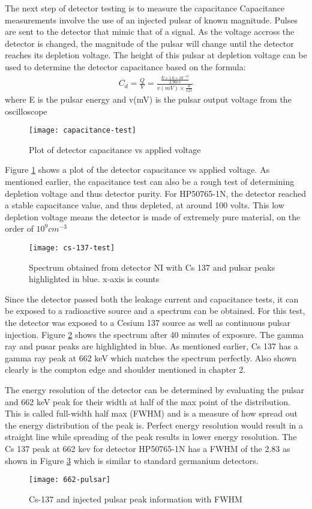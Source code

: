 The next step of detector testing is to measure the capacitance
Capacitance measurements involve the use of an injected pulsar of known magnitude.
Pulses are sent to the detector that mimic that of a signal.
As the voltage accross the detector is changed, the magnitude of the pulsar will change until the detector reaches its depletion voltage.
The height of this pulsar at depletion voltage can be used to determine the detector capacitance based on the formula:
\begin{align*}
C_d=\frac{Q}{V}=\frac{\frac{E\times 1.6\times 10^{-19}}{2.96ev}}{v(mV)\times \frac{8}{125}}
\end{align*}
where E is the pulsar energy and v(mV) is the pulsar output voltage from the oscilloscope

\begin{figure}[htpb]
\centering
\texttt{[image: capacitance-test]}
\caption{Plot of detector capacitance vs applied voltage}
\label{fig:capacitance-test}
\end{figure}
Figure \ref{fig:capacitance-test} shows a plot of the detector capacitance vs applied voltage.
As mentioned earlier, the capacitance test can also be a rough test of determining depletion voltage and thus detector purity.
For HP50765-1N, the detector reached a stable capacitance value, and thus depleted, at around 100 volts.
This low depletion voltage means the detector is made of extremely pure material, on the order of $10^{9}cm^{-3}$

\begin{figure}[htpb]
\centering
\texttt{[image: cs-137-test]}
\caption{Spectrum obtained from detector NI with Cs 137 and pulsar peaks highlighted in blue. x-axis is counts}
\label{fig:cs-137-test}
\end{figure}
Since the detector passed both the leakage current and capacitance tests, it can be exposed to a radioactive source and a spectrum can be obtained.
For this test, the detector was exposed to a Cesium 137 source as well as continuous pulsar injection.
Figure \ref{fig:cs-137-test} shows the spectrum after 40 minutes of exposure.
The gamma ray and pusar peaks are highlighted in blue.
As mentioned earlier, Cs 137 has a gamma ray peak at 662 keV which matches the spectrum perfectly.
Also shown clearly is the compton edge and shoulder mentioned in chapter 2.

The energy resolution of the detector can be determined by evaluating the pulsar and 662 keV peak for their width at half of the max point of the distribution.
This is called full-width half max (FWHM) and is a measure of how spread out the energy distribution of the peak is.
Perfect energy resolution would result in a straight line while spreading of the peak results in lower energy resolution.
The Cs 137 peak at 662 kev for detector HP50765-1N has a FWHM of the 2.83 as shown in Figure \ref{fig:662-pulsar} which is similar to standard germanium detectors.
\begin{figure}[htpb]
\centering
\texttt{[image: 662-pulsar]}
\caption{Cs-137 and injected pulsar peak information with FWHM}
\label{fig:662-pulsar}
\end{figure}


